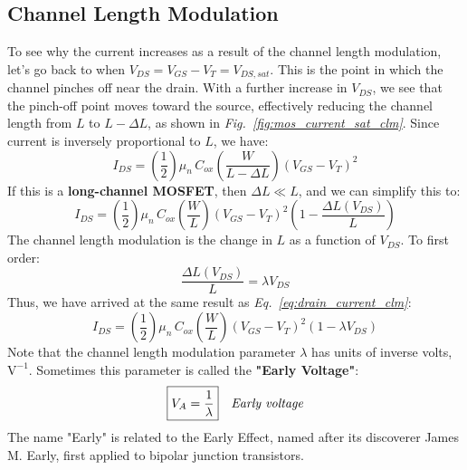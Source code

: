 \subsection{Channel Length Modulation} \label{sec:mos_clm}
To see why the current increases as a result of the channel length modulation, let's go back to when $V_{DS} = V_{GS} - V_T = V_{DS,sat}$.  This is the point in which the channel pinches off near the drain.  With a further increase in $V_{DS}$, we see that the pinch-off point moves toward the source, effectively reducing the channel length from $L$ to $L-\Delta L$, as shown in \emph{Fig.~\ref{fig:mos_current_sat_clm}}.  Since current is inversely proportional to $L$, we have:
    \begin{equation} 
        I_{DS} = \left( \frac{1}{2} \right) \mu_n\,C_{ox} \left( \frac{W}{L - \Delta L} \right) {\left( {V_{GS} - V_T} \right)}^2
    \end{equation}
If this is a \textbf{long-channel MOSFET}, then $\Delta L \ll L$, and we can simplify this to:
    \begin{equation} 
        I_{DS} = \left( \frac{1}{2} \right) \mu_n\,C_{ox} \left( \frac{W}{L} \right) {\left( {V_{GS} - V_T} \right)}^2 \left(1 - \frac{\Delta L(V_{DS})}{L} \right)
    \end{equation}
The channel length modulation is the change in $L$ as a function of $V_{DS}$.  To first order:
    \begin{equation} 
        \frac{\Delta L(V_{DS})}{L} = \lambda V_{DS}
    \end{equation}
Thus, we have arrived at the same result as \emph{Eq.~\ref{eq:drain_current_clm}}:
    \begin{equation*} 
        I_{DS} = \left( \frac{1}{2} \right) \mu_n\,C_{ox} \left( \frac{W}{L} \right) {\left( {V_{GS} - V_T} \right)}^2 \left(1 - \lambda V_{DS} \right)
    \end{equation*}
Note that the channel length modulation parameter $\lambda$ has units of inverse volts, $\mathrm{V^{-1}}$.  Sometimes this parameter is called the \textbf{"Early Voltage"}: 
    \begin{align} 
        \Aboxed{ V_A &= \frac{1}{\lambda} } &\textit{Early voltage}
        \label{eq:early_voltage}
    \end{align}
The name "Early" is related to the Early Effect, named after its discoverer James M. Early, first applied to bipolar junction transistors.
\newpage
